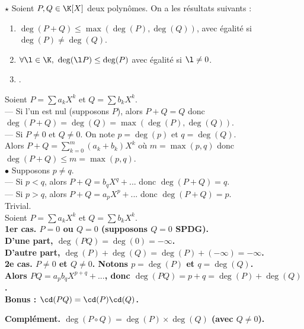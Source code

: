\documentclass[11pt]{article}
\begin{document}
\vspace*{-0.8cm}

\begin{prop}{$\star$}{}
    Soient $P,Q\in\K[X]$ deux polynômes. On a les résultats suivants :
    \begin{enumerate}
        \item $\deg(P+Q)\leq\max(\deg(P),\deg(Q))$, avec égalité si $\deg(P)\neq\deg(Q)$.
        \item $\forall \l \in \K, ~ \deg(\l P) \leq \deg(P)$ avec égalité si $\l\neq0$.
        \item {}.
    \end{enumerate}
    \tcblower
     Soient $P=\sum a_kX^k$ et $Q=\sum b_kX^k$.\\
    --- Si l'un est nul (supposons $P$), alors $P+Q=Q$ donc $\deg(P+Q)=\deg(Q)=\max(\deg(P),\deg(Q))$.\\
    --- Si $P\neq0$ et $Q\neq0$. On note $p=\deg(p)$ et $q=\deg(Q)$.\\
    Alors $P+Q=\sum_{k=0}^m (a_k+b_k)X^k$ où $m=\max(p,q)$ donc $\deg(P+Q)\leq m = \max(p,q)$.\\
    $\bullet$ Supposons $p\neq q$.\\
    --- Si $p<q$, alors $P+Q=b_qX^q + ...$ donc $\deg(P+Q)=q$.\\
    --- Si $p>q$, alors $P+Q=a_pX^p+...$ donc $\deg(P+Q)=p$.\\
     Trivial.\\
    \boxed{\star} Soient $P=\sum a_kX^k$ et $Q=\sum b_kX^k$.\\
    \bf{1er cas.} $P=0$ ou $Q=0$ (supposons $Q=0$ SPDG).\\
    D'une part, $\deg(PQ)=\deg(0)=-\infty$.\\
    D'autre part, $\deg(P)+\deg(Q)=\deg(P) + (-\infty) = -\infty$.\\
    \bf{2e cas.} $P\neq0$ et $Q\neq0$. Notons $p=\deg(P)$ et $q=\deg(Q)$.\\
    Alors $PQ=a_pb_qX^{p+q} + ...$, donc $\deg(PQ)=p+q=\deg(P)+\deg(Q)$.\\
    Bonus : $\cd(PQ)=\cd(P)\cd(Q)$.
\end{prop}

\bf{Complément.} $\deg(P\circ Q)=\deg(P)\times\deg(Q)$ (avec $Q\neq0$).
\end{document}
